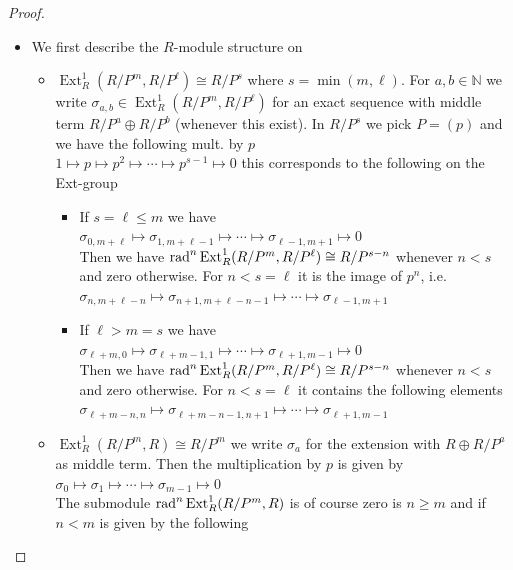 \documentclass[11pt,a4paper]{amsart}
\theoremstyle{plain}
\theoremstyle{definition}
\DeclareMathOperator{\Ext}{Ext}
\begin{document}
\begin{proof}
\begin{itemize}
\item[(1)] We first describe the $R$-module structure on 
\begin{itemize}
    \item[(a)] $\Ext^1_R (R/P^m, R/P^{\ell})\cong R/P^s$ where $s=\min (m, \ell)$. For $a,b\in \mathbb{N}$ we write $\sigma_{a,b}\in \Ext^1_R(R/P^m, R/P^{\ell})$ for an exact sequence with middle term $R/P^a\oplus R/P^b$ (whenever this exist). In $R/P^s$ we pick $P=(p)$ and we have the following mult. by $p$ \\
    $1 \mapsto p \mapsto p^2 \mapsto \cdots \mapsto p^{s-1} \mapsto 0$
    this corresponds to the following on the Ext-group
    \begin{itemize}
     \item[(a1)] If $s=\ell \leq m$ we have \\
      $\sigma_{0, m+\ell}\mapsto \sigma_{1, m+\ell-1} \mapsto\cdots \mapsto  \sigma_{\ell-1, m+1}  \mapsto 0$\\
     Then we have ${\rm rad}^n\Ext^1_R(R/P^m, R/P^{\ell})\cong R/P^{s-n}$ whenever $n<s$ and zero otherwise. For $n<s=\ell$ it is the image of $p^n$, i.e.   \\
      $\sigma_{n, m+\ell-n}\mapsto \sigma_{n+1, m+\ell-n-1} \mapsto\cdots \mapsto  \sigma_{\ell-1, m+1} $
     \item[(a2)] If $\ell >m=s$ we have \\
     $\sigma_{\ell +m, 0}\mapsto \sigma_{\ell+m-1, 1} \mapsto\cdots \mapsto  \sigma_{\ell+1,m-1} \mapsto 0$\\
     Then we have ${\rm rad}^n\Ext^1_R(R/P^m, R/P^{\ell})\cong R/P^{s-n}$ whenever $n<s$ and zero otherwise. For $n<s=\ell$ it contains the following elements  \\
      $\sigma_{\ell+m-n, n}\mapsto \sigma_{\ell +m-n-1,n+1} \mapsto\cdots \mapsto  \sigma_{\ell+1, m-1} $
    \end{itemize}
    \item[(b) ] $\Ext^1_R(R/P^m, R)\cong R/P^m$ we write $\sigma_a$ for the extension with $R \oplus R/P^a$ as middle term. Then the multiplication by $p$ is given by \\
    $\sigma_{0} \mapsto \sigma_{1} \mapsto \cdots \mapsto \sigma_{m-1} \mapsto 0$\\
    The submodule ${\rm rad}^n\Ext^1_R(R/P^m, R)$ is of course zero is $n\geq m$ and if $n<m$ is given by the following \\

\end{itemize}
\end{itemize}
\end{proof}
\end{document}

